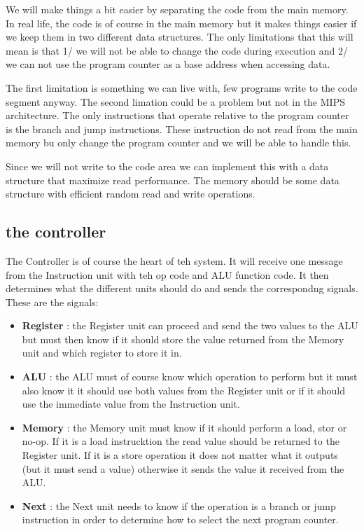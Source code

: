 \documentclass[a4paper,11pt]{article}
\begin{document}
We will make things a bit easier by separating the code from the main
memory. In real life, the code is of course in the main memory but it
makes things easier if we keep them in two different data
structures. The only limitations that this will mean is that 1/ we
will not be able to change the code during execution and 2/ we can not
use the program counter as a base address when accessing data.

The first limitation is something we can live with, few programs write
to the code segment anyway. The second limation could be a problem but
not in the MIPS architecture. The only instructions that operate
relative to the program counter is the branch and jump
instructions. These instruction do not read from the main memory bu
only change the program counter and we will be able to handle this.

Since we will not write to the code area we can implement this with a
data structure that maximize read performance. The memory should be
some data structure with efficient random read and write operations.


\subsection{the controller}

The Controller is of course the heart of teh system. It will receive
one message from the Instruction unit with teh op code and ALU function
code. It then determines what the different units should do and sends
the correspondng signals. These are the signals:

\begin{itemize}

\item {\bf Register} : the Register unit can proceed and send the two
  values to the ALU but must then know if it should store the value
  returned from the Memory unit and which register to store it in.

\item {\bf ALU} : the ALU must of course know which operation to
  perform but it must also know it it should use both values from the
  Register unit or if it should use the immediate value from the Instruction unit.

\item {\bf Memory} : the Memory unit must know if it should perform a
  load, stor or no-op. If it is a load instrucktion the read value
  should be returned to the Register unit. If it is a store operation
  it does not matter what it outputs (but it must send a value)
  otherwise it sends the value it received from the ALU.

\item {\bf Next} : the Next unit needs to know if the operation is a
  branch or jump instruction in order to determine how to select the
  next program counter.
  
\end{itemize}
\end{document}
